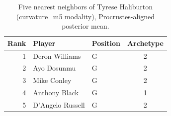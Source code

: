 \begin{table}[htbp]
  \centering\small
  \begin{tabular}{rllc}
    \toprule
    Rank & Player & Position & Archetype \\
    \midrule
    1 & Deron Williams & G & 2 \\
    2 & Ayo Dosunmu & G & 2 \\
    3 & Mike Conley & G & 2 \\
    4 & Anthony Black & G & 1 \\
    5 & D'Angelo Russell & G & 2 \\
    \bottomrule
  \end{tabular}
  \caption{Five nearest neighbors of Tyrese Haliburton (curvature_m5 modality), Procrustes-aligned posterior mean.}
  \label{tab:Tyrese_Haliburton_neighbors_curvature_m5}
\end{table}

